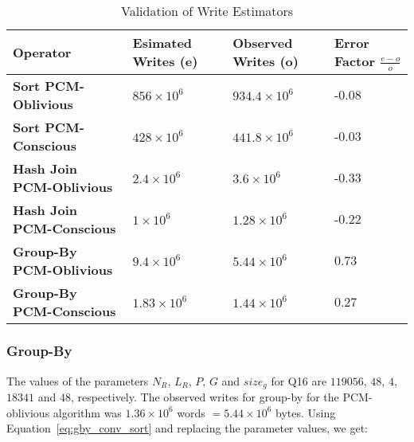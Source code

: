 \begin{table}[!h]                                                                                       
\centering                                                                                              
\caption{Validation of Write Estimators}
  \label{tab:estimator_validation}                                                                                
  \begin{small}                                                                                           
  \begin{tabular}{p{5cm}p{2cm}p{2cm}p{1cm}}
  \toprule                                                                                                
  
  \textbf{Operator} & \textbf{Esimated Writes} (e) & \textbf{Observed Writes} (o) & \textbf{Error Factor} $\frac{e-o}{o}$\\
  \midrule                                                                                                
  
  \textbf{Sort PCM-Oblivious} &  $856 \times 10^6$ & $934.4 \times 10^6$ & -0.08\\ 
    \textbf{Sort PCM-Conscious} &  $428 \times 10^6$ & $441.8 \times 10^6$ & -0.03\\ 
  \textbf{Hash Join PCM-Oblivious} &  $ 2.4 \times 10^6$ &$3.6 \times 10^6$ & -0.33\\ 
  \textbf{Hash Join PCM-Conscious} &  $1 \times 10^6$ & $1.28 \times 10^6$ & -0.22\\ 
  \textbf{Group-By PCM-Oblivious} &  $9.4 \times 10^6$ & $5.44 \times 10^6$ & 0.73\\ 
  \textbf{Group-By PCM-Conscious} &  $1.83 \times 10^6$ &$1.44 \times 10^6$ & 0.27\\ 
  
  \bottomrule                                                                                             
  \end{tabular}                                                                                           
  \end{small}                                                                                             
  \end{table} 
  
\subsubsection{Group-By}
The values of the parameters $N_R$, $L_R$, $P$, $G$ and $size_g$ for Q16
are $119056$, $48$, $4$, $18341$ and $48$, respectively.  The observed
writes for group-by for the PCM-oblivious algorithm was $1.36 \times 10^6$
words $= 5.44 \times 10^6$ bytes. Using Equation~\ref{eq:gby_conv_sort}
and replacing the parameter values, we get: 

